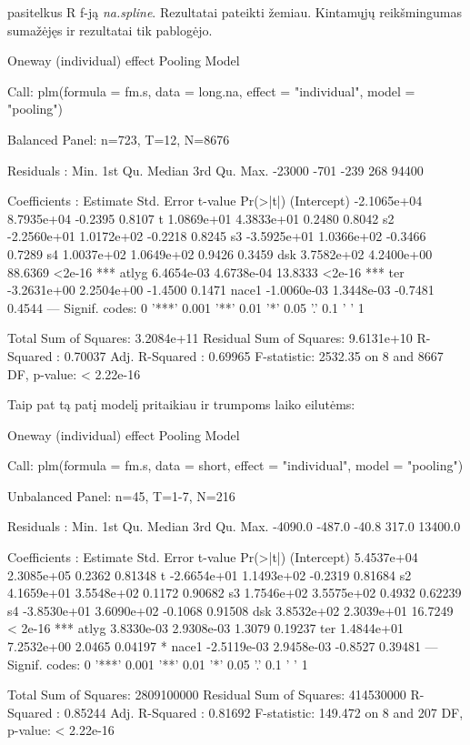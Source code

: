 \documentclass[a4paper]{article}
\newcommand{\R}{R}
\begin{document}
pasitelkus \R{} f-ją \emph{na.spline}. Rezultatai pateikti
žemiau. Kintamųjų reikšmingumas sumažėjęs ir rezultatai tik pablogėjo.
\begin{Schunk}
\begin{Soutput}
Oneway (individual) effect Pooling Model

Call:
plm(formula = fm.s, data = long.na, effect = "individual", model = "pooling")

Balanced Panel: n=723, T=12, N=8676

Residuals :
   Min. 1st Qu.  Median 3rd Qu.    Max. 
 -23000    -701    -239     268   94400 

Coefficients :
               Estimate  Std. Error t-value Pr(>|t|)    
(Intercept) -2.1065e+04  8.7935e+04 -0.2395   0.8107    
t            1.0869e+01  4.3833e+01  0.2480   0.8042    
s2          -2.2560e+01  1.0172e+02 -0.2218   0.8245    
s3          -3.5925e+01  1.0366e+02 -0.3466   0.7289    
s4           1.0037e+02  1.0649e+02  0.9426   0.3459    
dsk          3.7582e+02  4.2400e+00 88.6369   <2e-16 ***
atlyg        6.4654e-03  4.6738e-04 13.8333   <2e-16 ***
ter         -3.2631e+00  2.2504e+00 -1.4500   0.1471    
nace1       -1.0060e-03  1.3448e-03 -0.7481   0.4544    
---
Signif. codes:  0 '***' 0.001 '**' 0.01 '*' 0.05 '.' 0.1 ' ' 1 

Total Sum of Squares:    3.2084e+11
Residual Sum of Squares: 9.6131e+10
R-Squared      :  0.70037 
      Adj. R-Squared :  0.69965 
F-statistic: 2532.35 on 8 and 8667 DF, p-value: < 2.22e-16
\end{Soutput}
\end{Schunk}
Taip pat tą patį modelį pritaikiau ir trumpoms laiko eilutėms:
\begin{Schunk}
\begin{Soutput}
Oneway (individual) effect Pooling Model

Call:
plm(formula = fm.s, data = short, effect = "individual", model = "pooling")

Unbalanced Panel: n=45, T=1-7, N=216

Residuals :
   Min. 1st Qu.  Median 3rd Qu.    Max. 
-4090.0  -487.0   -40.8   317.0 13400.0 

Coefficients :
               Estimate  Std. Error t-value Pr(>|t|)    
(Intercept)  5.4537e+04  2.3085e+05  0.2362  0.81348    
t           -2.6654e+01  1.1493e+02 -0.2319  0.81684    
s2           4.1659e+01  3.5548e+02  0.1172  0.90682    
s3           1.7546e+02  3.5575e+02  0.4932  0.62239    
s4          -3.8530e+01  3.6090e+02 -0.1068  0.91508    
dsk          3.8532e+02  2.3039e+01 16.7249  < 2e-16 ***
atlyg        3.8330e-03  2.9308e-03  1.3079  0.19237    
ter          1.4844e+01  7.2532e+00  2.0465  0.04197 *  
nace1       -2.5119e-03  2.9458e-03 -0.8527  0.39481    
---
Signif. codes:  0 '***' 0.001 '**' 0.01 '*' 0.05 '.' 0.1 ' ' 1 

Total Sum of Squares:    2809100000
Residual Sum of Squares: 414530000
R-Squared      :  0.85244 
      Adj. R-Squared :  0.81692 
F-statistic: 149.472 on 8 and 207 DF, p-value: < 2.22e-16
\end{Soutput}
\end{Schunk}
\end{document}

